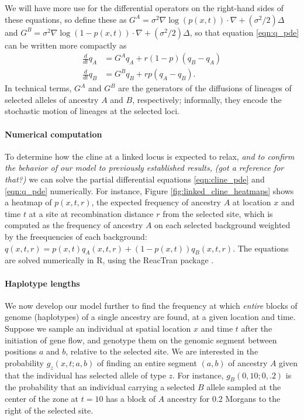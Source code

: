 \documentclass[11pt,letterpaper]{article}
\newcommand{\alisa}[1]{{\em \color{red} #1}}
\newcommand{\plr}[1]{{\em \color{blue} #1}}
\newcommand{\grad}{\nabla}
\begin{document}
We will have more use for the differential operators on the right-hand sides of these equations,
so define these as
$G^A = \sigma^2 \grad \log(p(x,t)) \cdot \grad + (\sigma^2/2) \Delta$
and
$G^B = \sigma^2 \grad \log(1-p(x,t)) \cdot \grad + (\sigma^2/2) \Delta$,
so that equation \eqref{eqn:q_pde} can be written more compactly as
\begin{align*}
    \frac{d}{dt} q_A &= G^A q_A + r (1-p) (q_B-q_A) \\
    \frac{d}{dt} q_B &= G^B q_B + r p (q_A-q_B) .
\end{align*}
In technical terms, $G^A$ and $G^B$ are the generators of the diffusions of lineages of selected alleles of ancestry $A$ and $B$, respectively;
informally, they encode the stochastic motion of lineages at the selected loci.


\paragraph{Numerical computation}
To determine how the cline at a linked locus is expected to relax, 
\alisa{and to confirm the behavior of our model to previously established results,}
\plr{(got a reference for that?)}
we can solve the partial differential equations \eqref{eqn:cline_pde} and \eqref{eqn:q_pde} numerically.
For instance, Figure \ref{fig:linked_cline_heatmaps} shows a heatmap of $p(x,t,r)$, 
the expected frequency of ancestry $A$ at location $x$ and time $t$ 
at a site at recombination distance $r$ from the selected site,
which is computed as the frequency of ancestry $A$ on each selected background weighted by the freequencies of each background:
$q(x,t,r) = p(x,t) q_A(x,t,r) + (1-p(x,t)) q_B(x,t,r)$. 
The equations are solved numerically in R, using the ReacTran package \citep{soetaert2012reactive}.

\paragraph{Haplotype lengths}
We now develop our model further to find the frequency at which \emph{entire} blocks of genome (haplotypes) 
of a single ancestry are found, at a given location and time.
Suppose we sample an individual at spatial location $x$ and time $t$ after the initiation of gene flow,
and genotype them on the genomic segment between positions $a$ and $b$, relative to the selected site. 
We are interested in the probability $g_z(x,t;a,b)$ 
of finding an entire segment $(a,b)$ of ancestry $A$ 
given that the individual has selected allele of type $z$.
For instance, $g_B(0,10;0,.2)$ is the probability that an individual carrying a selected $B$ allele sampled at the center of the zone
at $t=10$ has a block of $A$ ancestry for 0.2 Morgans to the right of the selected site.
\end{document}
